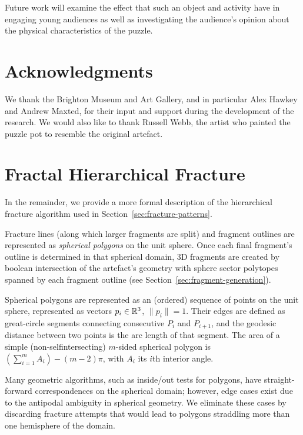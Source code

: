 \documentclass[acmlarge,screen,dvipsnames]{acmart}
\begin{document}
Future work will examine the effect that such an object and activity
have in engaging young audiences as well as investigating the
audience's opinion about the physical characteristics of the puzzle.

\section{Acknowledgments}

We thank the Brighton Museum and Art Gallery, and in particular Alex
Hawkey and Andrew Maxted, for their input and support during the
development of the research. We would also like to thank Russell Webb,
the artist who painted the puzzle pot to resemble the original
artefact.

\appendix

\newcommand{\IR}{\RR}

\section{Fractal Hierarchical Fracture}
\label{apx:hierarchical-algo}

In the remainder, we provide a more formal description of the
hierarchical fracture algorithm used in
Section~\ref{sec:fracture-patterns}.

Fracture lines (along which larger fragments are split) and fragment
outlines are represented as \emph{spherical polygons} on the unit
sphere. Once each final fragment's outline is determined in that
spherical domain, 3D fragments are created by boolean intersection of
the artefact's geometry with sphere sector polytopes spanned by each
fragment outline (see Section~\ref{sec:fragment-generation}).

Spherical polygons are represented as an (ordered) sequence of points
on the unit sphere, represented as vectors $p_i\in\IR^3$,
$\|p_i\|=1$. Their edges are defined as great-circle segments
connecting consecutive $P_i$ and $P_{i+1}$, and the geodesic distance
between two points is the arc length of that segment. The area of a
simple (non-selfintersecting) $m$-sided spherical polygon is
$(\sum_{i=1}^m A_i) - (m-2)\pi$, with $A_i$ its $i$th interior angle.

Many geometric algorithms, such as inside/out tests for polygons, have
straight-forward correspondences on the spherical domain; however,
edge cases exist due to the antipodal ambiguity in spherical
geometry. We eliminate these cases by discarding fracture attempts
that would lead to polygons straddling more than one hemisphere of the
domain.
\end{document}
